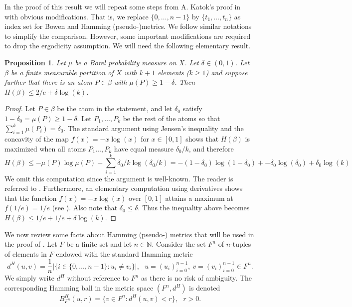 \documentclass[a4paper,oneside]{amsart}
\renewcommand{\(}{\begin{dmath*}}
\renewcommand{\)}{\end{dmath*}}
\newtheorem{proposition}[theorem]{Proposition}
\theoremstyle{definition}
\newcommand{\N}{\mathbb{N}}
\begin{document}
In the proof of this result we will repeat some steps from A. Katok's proof in \cite[Theorem 1.1]{katok_lyapunov_1980} with obvious modifications. That is, we replace $\{0,\dots,n-1\}$ by $\{t_1,\dots,t_n\}$ as index set for Bowen and Hamming (pseudo-)metrics. We follow similar notations to simplify the comparison.  However, some important modifications are required to drop the ergodicity assumption. We will need the following elementary result. 
\begin{proposition}\label{partition-with-one-very-big-atom}
    Let $\mu$ be a Borel probability measure on $X$. 
    Let $\delta\in(0,1
    )$. Let $\beta$ be a finite measurable partition of $X$ with $k+1$ elements ($k\geq 1$) and suppose further that there is an atom $P\in\beta$ with $\mu(P)\geq 1-\delta$. Then $H(\beta)\leq 2/e+\delta\log(k)$. 
\end{proposition}
\begin{proof}
    Let $P\in\beta$ be the atom in the statement, and let $\delta_0$ satisfy $1-\delta_0=\mu(P)\geq 1-\delta$.  Let $P_1,\dots,P_k$ be the rest of the atoms so that $\sum_{i=1}^k\mu(P_i)=\delta_0$. The standard argument using Jensen's inequality and the concavity of the map $f(x)=-x\log(x)$ for $x\in [0,1]$ shows that $H(\beta)$ is maximized when all atoms $P_1\dots,P_k$ have equal measure $\delta_0/k$, and therefore \(H(\beta)\leq -\mu(P)\log\mu(P)-\sum_{i=1}^k \delta_0/k\log(\delta_0/k) 
    =-(1-\delta_0)\log(1-\delta_0)+-\delta_0\log(\delta_0)+\delta_0\log(k)\)
    We omit this computation since the argument is well-known. The reader is referred to   \cite[page 231]{petersen_ergodic_1983}. Furthermore, an elementary computation using derivatives shows that the function $f(x)=-x\log(x)$ over $[0,1]$ attains a maximum at $f(1/e)=1/e$ (see \cite[Page 79]{walters_introduction_2000}). Also note that $\delta_0\leq \delta$. Thus the inequality above becomes $H(\beta)\leq 1/e+1/e+\delta\log(k)$. \end{proof}
    We  now review some facts about Hamming (pseudo-) metrics that will be used in the proof of . Let $F$ be a finite set and let $n\in\N$. Consider the set  $F^n$ of $n$-tuples of elements in $F$ endowed with the standard Hamming metric \[d^H(u,v)=\frac{1}{n}|\{i\in\{0,\dots,n-1\} : u_i\ne v_i\}|, \ \ \ u=(u_i)_{i=0}^{n-1}, \ v=(v_i)_{i=0}^{n-1}\in F^n.\]
    We simply write $d^H$ without reference to $F^n$ as there is no risk of ambiguity. The corresponding Hamming ball in the metric space $(F^n,d^H)$ is denoted
    \[
    B^H_{F^n}(u,r)=\{v\in F^n : d^H(u,v)<r\}, \ \ \ r>0.
    \]
\end{document}
